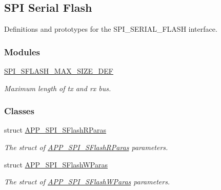 \hypertarget{group___s_p_i___s_e_r_i_a_l___f_l_a_s_h}{}\subsection{S\+PI Serial Flash}
\label{group___s_p_i___s_e_r_i_a_l___f_l_a_s_h}


Definitions and prototypes for the S\+P\+I\+\_\+\+S\+E\+R\+I\+A\+L\+\_\+\+F\+L\+A\+SH interface.  


\subsubsection*{Modules}
\begin{DoxyCompactItemize}
\item 
\hyperlink{group___s_p_i___s_f_l_a_s_h___m_a_x}{S\+P\+I\+\_\+\+S\+F\+L\+A\+S\+H\+\_\+\+M\+A\+X\+\_\+\+S\+I\+Z\+E\+\_\+\+D\+EF}
\begin{DoxyCompactList}\small\item\em Maximum length of tx and rx bus. \end{DoxyCompactList}\end{DoxyCompactItemize}
\subsubsection*{Classes}
\begin{DoxyCompactItemize}
\item 
struct \hyperlink{struct_a_p_p___s_p_i___s_flash_r_paras}{A\+P\+P\+\_\+\+S\+P\+I\+\_\+\+S\+Flash\+R\+Paras}
\begin{DoxyCompactList}\small\item\em The struct of \hyperlink{struct_a_p_p___s_p_i___s_flash_r_paras}{A\+P\+P\+\_\+\+S\+P\+I\+\_\+\+S\+Flash\+R\+Paras} parameters. \end{DoxyCompactList}\item 
struct \hyperlink{struct_a_p_p___s_p_i___s_flash_w_paras}{A\+P\+P\+\_\+\+S\+P\+I\+\_\+\+S\+Flash\+W\+Paras}
\begin{DoxyCompactList}\small\item\em The struct of \hyperlink{struct_a_p_p___s_p_i___s_flash_w_paras}{A\+P\+P\+\_\+\+S\+P\+I\+\_\+\+S\+Flash\+W\+Paras} parameters. \end{DoxyCompactList}\end{DoxyCompactItemize}
